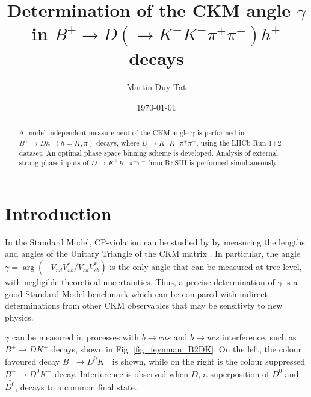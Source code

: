 \documentclass[12pt, a4paper, notitlepage, onecolumn]{article}
\title{Determination of the CKM angle $\gamma$ in $B^\pm\to D(\to K^+K^-\pi^+\pi^-)h^\pm$ decays}
\author{Martin Duy Tat}
\date{\today}
\begin{document}
\maketitle
\begin{abstract}
\noindent A model-independent measurement of the CKM angle $\gamma$ is performed in $B^\pm\to Dh^\pm (h = K, \pi)$ decays, where $D\to K^+K^-\pi^+\pi^-$, using the LHCb Run $1$+$2$ dataset. An optimal phase space binning scheme is developed. Analysis of external strong phase inputs of $D\to K^+K^-\pi^+\pi^-$ from BESIII is performed simultaneously.
\end{abstract}
\section{Introduction}
\noindent In the Standard Model, CP-violation can be studied by by measuring the lengths and angles of the Unitary Triangle of the CKM matrix \cite{cite_CKM}. In particular, the angle $\gamma = \arg(-V_{ud}V^*_{ub}/V_{cd}V^*_{cb})$ is the only angle that can be measured at tree level, with negligible theoretical uncertainties. Thus, a precise determination of $\gamma$ is a good Standard Model benchmark which can be compared with indirect determinations from other CKM observables that may be sensitivty to new physics.

$\gamma$ can be measured in processes with $b\to c\bar{u}s$ and $b\to u\bar{c}s$ interference, such as $B^\pm\to DK^\pm$ decays, shown in Fig. \ref{fig_feynman_B2DK}. On the left, the colour favoured decay $B^-\to D^0K^-$ is shown, while on the right is the colour suppressed $B^-\to\bar{D^0}K^-$ decay. Interference is observed when $D$, a superposition of $D^0$ and $\bar{D^0}$, decays to a common final state.
\end{document}
